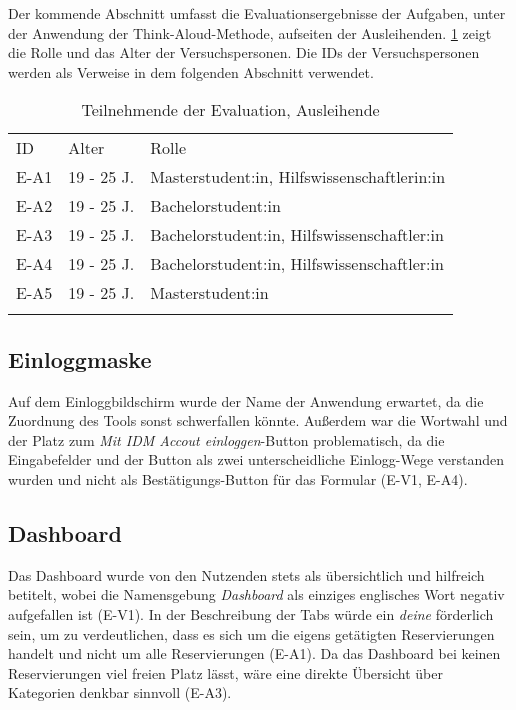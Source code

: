 Der kommende Abschnitt umfasst die Evaluationsergebnisse der Aufgaben, unter der
Anwendung der Think-Aloud-Methode, aufseiten der Ausleihenden. \ref{table:azwei}
zeigt die Rolle und das Alter der Versuchspersonen. Die IDs der Versuchspersonen
werden als Verweise in dem folgenden Abschnitt verwendet.

\begin{table}[h]
  \centering
  \caption{Teilnehmende der Evaluation, Ausleihende}
  \begin{tabular}{lll}
    \arrayrulecolor{maincolor}\hline
    \sffamily\color{maincolor}ID & \sffamily\color{maincolor}Alter &
    \sffamily\color{maincolor}Rolle                                  \\
    \arrayrulecolor{maincolor}\hline
    E-A1                         & 19 - 25 J.                      &
    Masterstudent:in, Hilfswissenschaftlerin:in                      \\
    E-A2                         & 19 - 25 J.                      &
    Bachelorstudent:in                                               \\
    E-A3                         & 19 - 25 J.                      &
    Bachelorstudent:in, Hilfswissenschaftler:in                      \\
    E-A4                         & 19 - 25 J.                      &
    Bachelorstudent:in, Hilfswissenschaftler:in                      \\
    E-A5                         & 19 - 25 J.                      &
    Masterstudent:in                                                 \\
    \arrayrulecolor{maincolor}\hline
  \end{tabular}
  \label{table:azwei}
\end{table}

\subsection{Einloggmaske}
Auf dem Einloggbildschirm wurde der Name der Anwendung erwartet, da die
Zuordnung des Tools sonst schwerfallen könnte. Außerdem war die Wortwahl und der
Platz zum \textit{Mit IDM Accout einloggen}-Button problematisch, da die
Eingabefelder und der Button als zwei unterscheidliche Einlogg-Wege verstanden
wurden und nicht als Bestätigungs-Button für das Formular (E-V1, E-A4).

\subsection{Dashboard}
Das Dashboard wurde von den Nutzenden stets als übersichtlich und hilfreich
betitelt, wobei die Namensgebung \textit{Dashboard} als einziges englisches
Wort negativ aufgefallen ist (E-V1). In der Beschreibung der Tabs würde ein
\textit{deine} förderlich sein, um zu verdeutlichen, dass es sich um die eigens
getätigten Reservierungen handelt und nicht um alle Reservierungen (E-A1). Da
das Dashboard bei keinen Reservierungen viel freien Platz lässt, wäre eine
direkte Übersicht über Kategorien denkbar sinnvoll (E-A3). 


